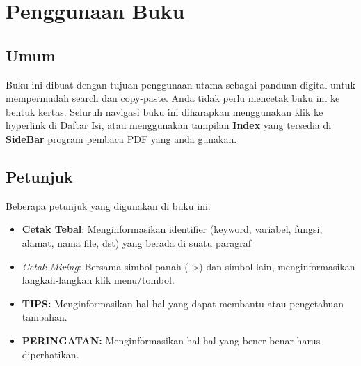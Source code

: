 \documentclass[12pt]{book}
\begin{document}
	\newpage
	\chapter{Penggunaan Buku}
	
	\section{Umum}
	Buku ini dibuat dengan tujuan penggunaan utama sebagai panduan digital untuk mempermudah search dan copy-paste.
	Anda tidak perlu mencetak buku ini ke bentuk kertas.
	Seluruh navigasi buku ini diharapkan menggunakan klik ke hyperlink di Daftar Isi,
	atau menggunakan tampilan \textbf{Index} yang tersedia di \textbf{SideBar} program pembaca PDF yang anda gunakan.
	
	\section{Petunjuk}
	Beberapa petunjuk yang digunakan di buku ini:
	\begin{itemize}
		\item \textbf{Cetak Tebal}: Menginformasikan identifier (keyword, variabel, fungsi, alamat, nama file, dst) yang berada di suatu paragraf
		\item \textit{Cetak Miring}: Bersama simbol panah (->) dan simbol lain, menginformasikan langkah-langkah klik menu/tombol.
		\item \textbf{TIPS:} Menginformasikan hal-hal yang dapat membantu atau pengetahuan tambahan.
		\item \textbf{PERINGATAN:} Menginformasikan hal-hal yang bener-benar harus diperhatikan.
	\end{itemize}
\end{document}
